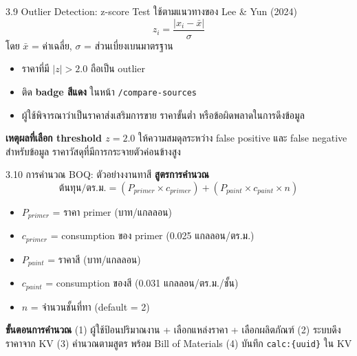 \documentclass[aspectratio=169,11pt]{beamer}
\begin{document}
\begin{frame}{3.9 Outlier Detection: z-score Test}
  ใช้ตามแนวทางของ Lee \& Yun (2024)
  \[
    z_i = \frac{|x_i - \bar{x}|}{\sigma}
  \]
  โดย $\bar{x}$ = ค่าเฉลี่ย, $\sigma$ = ส่วนเบี่ยงเบนมาตรฐาน
  \vspace{0.3em}
  \begin{itemize}
    \item ราคาที่มี $|z| > 2.0$ ถือเป็น outlier
    \item ติด \textbf{badge สีแดง} ในหน้า \texttt{/compare-sources}
    \item ผู้ใช้พิจารณาว่าเป็นราคาส่งเสริมการขาย ราคาขั้นต่ำ
          หรือข้อผิดพลาดในการดึงข้อมูล
  \end{itemize}
  \vspace{0.3em}
  \begin{block}{\textbf{เหตุผลที่เลือก threshold $z = 2.0$}}
    ให้ความสมดุลระหว่าง false positive และ false negative สำหรับข้อมูล
    ราคาวัสดุที่มีการกระจายตัวค่อนข้างสูง
  \end{block}
\end{frame}

\begin{frame}{3.10 การคำนวณ BOQ: ตัวอย่างงานทาสี}
  \textbf{สูตรการคำนวณ}
  \[
    \text{ต้นทุน/ตร.ม.} = (P_{primer} \times c_{primer}) +
                          (P_{paint} \times c_{paint} \times n)
  \]
  \begin{itemize}
    \item $P_{primer}$ = ราคา primer (บาท/แกลลอน)
    \item $c_{primer}$ = consumption ของ primer (0.025 แกลลอน/ตร.ม.)
    \item $P_{paint}$ = ราคาสี (บาท/แกลลอน)
    \item $c_{paint}$ = consumption ของสี (0.031 แกลลอน/ตร.ม./ชั้น)
    \item $n$ = จำนวนชั้นที่ทา (default = 2)
  \end{itemize}
  \vspace{0.3em}
  \begin{block}{\textbf{ขั้นตอนการคำนวณ}}
    (1) ผู้ใช้ป้อนปริมาณงาน + เลือกแหล่งราคา + เลือกผลิตภัณฑ์
    \quad (2) ระบบดึงราคาจาก KV
    \quad (3) คำนวณตามสูตร พร้อม Bill of Materials
    \quad (4) บันทึก \texttt{calc:\{uuid\}} ใน KV
  \end{block}
\end{frame}
\end{document}
